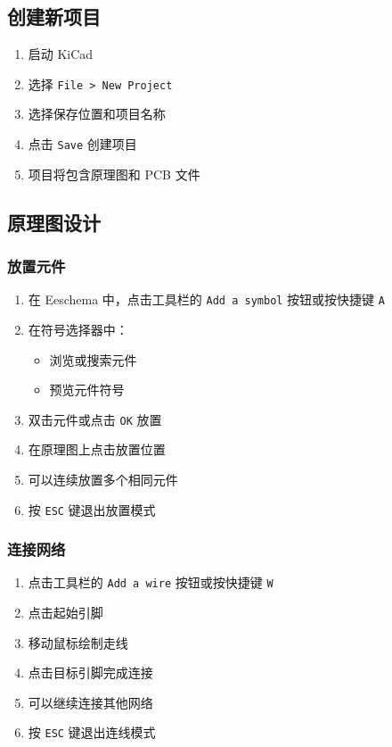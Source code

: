 \subsection{创建新项目}


\begin{enumerate}
  \item 启动 KiCad
  \item 选择 \lstinline{File > New Project}
  \item 选择保存位置和项目名称
  \item 点击 \lstinline{Save} 创建项目
  \item 项目将包含原理图和 PCB 文件
\end{enumerate}

\subsection{原理图设计}

\subsubsection{放置元件}


\begin{enumerate}
  \item 在 Eeschema 中，点击工具栏的 \lstinline{Add a symbol} 按钮或按快捷键 \lstinline{A}
  \item 在符号选择器中：
    \begin{itemize}
      \item 浏览或搜索元件
      \item 预览元件符号
    \end{itemize}
  \item 双击元件或点击 \lstinline{OK} 放置
  \item 在原理图上点击放置位置
  \item 可以连续放置多个相同元件
  \item 按 \lstinline{ESC} 键退出放置模式
\end{enumerate}

\subsubsection{连接网络}


\begin{enumerate}
  \item 点击工具栏的 \lstinline{Add a wire} 按钮或按快捷键 \lstinline{W}
  \item 点击起始引脚
  \item 移动鼠标绘制走线
  \item 点击目标引脚完成连接
  \item 可以继续连接其他网络
  \item 按 \lstinline{ESC} 键退出连线模式
\end{enumerate}

